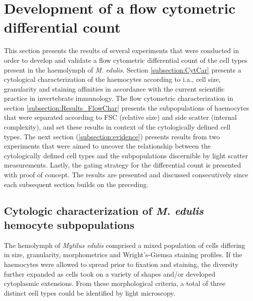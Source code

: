 \section{Development of a flow cytometric differential count}
This section presents the results of several experiments that were conducted in order to develop and validate a flow cytometric differential count of the cell types present in the haemolymph of \emph{M. edulis}. Section \ref{subsection:CytCar} presents a cytological characterization of the haemocytes according to i.a., cell size, granularity and staining affinities in accordance with the current scientific practice in invertebrate immunology. The flow cytometric characterization in section \ref{subsection:Results_FlowChar} presents the subpopulations of haemocytes that were separated according to FSC (relative size) and side scatter (internal complexity), and set these results in context of the cytologically defined cell types. The next section (\ref{subsection:evidence}) presents results from two experiments that were aimed to uncover the relationship between the cytologically defined cell types and the subpopulations discernible by light scatter measurements. Lastly, the gating strategy for the differential count is presented with proof of concept. The results are presented and discussed consecutively since each subsequent section builds on the preceding.

\subsection{Cytologic characterization of \emph{M. edulis} hemocyte subpopulations}
\label{subsection:Results_cytchar}
The hemolymph of \emph{Mytilus edulis} comprised a mixed population of cells differing in size, granularity, morphometrics and Wright's-Giemsa staining profiles. If the haemocytes were allowed to spread prior to fixation and staining, the diversity further expanded as cells took on a variety of shapes and/or developed cytoplasmic extensions. From these morphological criteria, a total of three distinct cell types could be identified by light microscopy.

